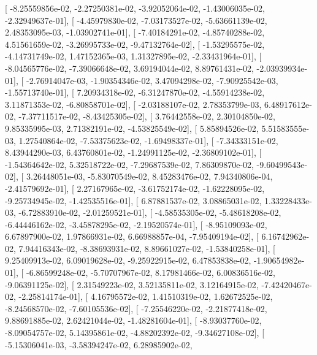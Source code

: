 \documentclass{article}
\begin{document}
       [ -8.25559856e-02,  -2.27250381e-02,  -3.92052064e-02,
         -1.43006035e-02,  -2.32949637e-01],
       [ -4.45979830e-02,  -7.03173527e-02,  -5.63661139e-02,
          2.48353095e-03,  -1.03902741e-01],
       [ -7.40184291e-02,  -4.85740288e-02,   4.51561659e-02,
         -3.26995733e-02,  -9.47132764e-02],
       [ -1.53295575e-02,  -4.14731749e-02,   1.47152365e-03,
          1.31327895e-02,  -2.33431964e-01],
       [ -8.04565776e-02,  -7.39066648e-02,   3.69194044e-02,
          8.89761431e-02,  -2.03939934e-01],
       [ -2.76914047e-03,  -1.90354346e-02,   3.47094298e-02,
         -7.90925542e-03,  -1.55713740e-01],
       [  7.20934318e-02,  -6.31247870e-02,  -4.55914238e-02,
          3.11871353e-02,  -6.80858701e-02],
       [ -2.03188107e-02,   2.78353799e-03,   6.48917612e-02,
         -7.37711517e-02,  -8.43425305e-02],
       [  3.76442558e-02,   2.30104850e-02,   9.85335995e-03,
          2.71382191e-02,  -4.53825549e-02],
       [  5.85894526e-02,   5.51583555e-03,   1.27540864e-02,
         -7.53375623e-02,  -1.69498337e-01],
       [ -7.34333151e-02,   8.43944290e-03,   6.43760801e-02,
         -1.24991125e-02,  -2.36809102e-01],
       [ -1.54364642e-02,   5.32518722e-02,  -7.29687539e-02,
          7.86309870e-02,  -9.60499543e-02],
       [  3.26448051e-03,  -5.83070549e-02,   8.45283476e-02,
          7.94340806e-04,  -2.41579692e-01],
       [  2.27167965e-02,  -3.61752174e-02,  -1.62228095e-02,
         -9.25734945e-02,  -1.42535516e-01],
       [  6.87881537e-02,   3.08865031e-02,   1.33228433e-03,
         -6.72883910e-02,  -2.01259521e-01],
       [ -4.58535305e-02,  -5.48618208e-02,  -6.44446162e-02,
         -3.45878295e-02,  -2.19520574e-01],
       [ -8.95109093e-02,   6.67897900e-02,   1.97866931e-02,
          6.66988857e-04,  -7.95409194e-02],
       [  6.16742962e-02,   7.94416343e-02,  -8.38693931e-02,
          8.89661027e-02,  -1.53840258e-01],
       [  9.25409913e-02,   6.09019628e-02,  -9.25922915e-02,
          6.47853838e-02,  -1.90654982e-01],
       [ -6.86599248e-02,  -5.70707967e-02,   8.17981466e-02,
          6.00836516e-02,  -9.06391125e-02],
       [  2.31549223e-02,   3.52135811e-02,   3.12164915e-02,
         -7.42420467e-02,  -2.25814174e-01],
       [  4.16795572e-02,   1.41510319e-02,   1.62672525e-02,
         -8.24568570e-02,  -7.60105536e-02],
       [ -7.25546220e-02,  -2.21877418e-02,   9.88691885e-02,
          2.62421044e-02,  -1.48281604e-01],
       [ -8.93037760e-02,  -8.09054757e-02,   5.14395861e-02,
         -4.88202392e-02,  -9.34627108e-02],
       [ -5.15306041e-03,  -3.58394247e-02,   6.28985902e-02,
\end{document}
